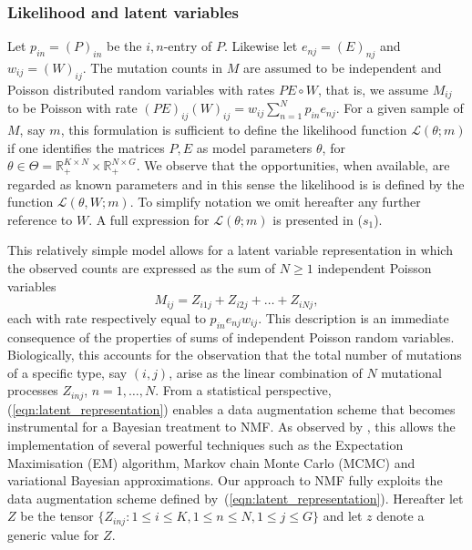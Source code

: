 \documentclass{bioinfo}
\begin{document}
\subsubsection{Likelihood and latent variables}
Let $p_{in} = (P)_{in}$ be the $i,n$-entry of $P$. Likewise let
$e_{nj} = (E)_{nj}$ and $w_{ij} = (W)_{ij}$.  The mutation counts in
$M$ are assumed to be independent and Poisson distributed random
variables with rates $PE\circ W$, that is, we assume $M_{ij}$ to be
Poisson with rate $(PE)_{ij}(W)_{ij} = w_{ij}\sum_{n=1}^N
p_{in}e_{nj}$. For a given sample of $M$, say $m$, this formulation is
sufficient to define the likelihood function $\mathcal L(\theta; m)$
if one identifies the matrices $P, E$ as model parameters $\theta$,
for $\theta \in \Theta = \mathbb R_+^{K\times N}\times \mathbb 
R_+^{N\times G}$. We observe that the opportunities, when available,
are regarded as known parameters and in this sense the likelihood is
is  defined by the function $\mathcal L(\theta, W; m)$. To simplify 
notation we omit hereafter any further reference to $W$. A full
expression for $\mathcal L(\theta; m)$ is presented in ($s_1$).


This relatively simple model allows for a latent variable
representation in which the observed counts are expressed as the sum
of $N\geq 1$ independent Poisson variables
\begin{equation}
  \label{eqn:latent_representation}
   M_{ij} = Z_{i1j} + Z_{i2j} + \ldots + Z_{iNj},
\end{equation} 
each with rate respectively equal to $p_{in}e_{nj}w_{ij}$. This
description is an immediate consequence of the properties of sums of
independent Poisson random variables. Biologically, this accounts for
the observation that the total number of mutations of a specific type,
say $(i,j)$, arise as the linear combination of $N$ mutational
processes $Z_{inj}$, $n = 1, \ldots, N$. From a statistical
perspective, (\ref{eqn:latent_representation}) enables a data
augmentation scheme that becomes instrumental for a Bayesian treatment
to NMF. As observed by \cite{C}, this allows the implementation of
several powerful techniques such as the Expectation Maximisation (EM)
algorithm, Markov chain Monte Carlo (MCMC) and variational Bayesian
approximations.  Our approach to NMF fully exploits the
data augmentation scheme defined
by~(\ref{eqn:latent_representation}).  Hereafter let $Z$  be the
tensor $\{Z_{inj}:
1\leq i\leq K, 1\leq n \leq N, 1\leq
j\leq G\}$ and let $z$ denote a generic value for $Z$.
\end{document}
